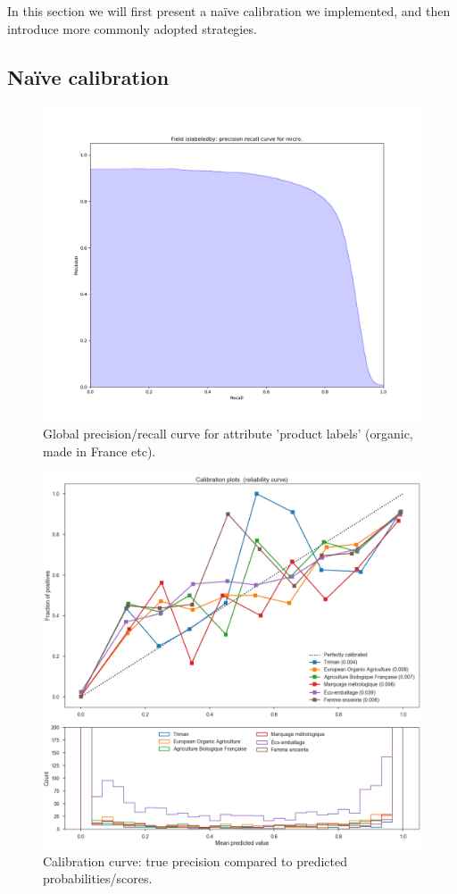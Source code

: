 In this section we will first present a naïve calibration we implemented, and then introduce more commonly adopted strategies.

\subsection{Naïve calibration}

\begin{figure}[H]
\centering
\includegraphics[scale=0.5]{./images/calibration/precision_recall_curve.png}
\caption{Global precision/recall curve for attribute 'product labels' (organic, made in France etc).}
\end{figure}


\begin{figure}[H]
\centering
\includegraphics[scale=0.40]{./images/calibration/islabeledby_calibration_curve.png}
\caption{Calibration curve: true precision compared to predicted probabilities/scores.}
\end{figure}

